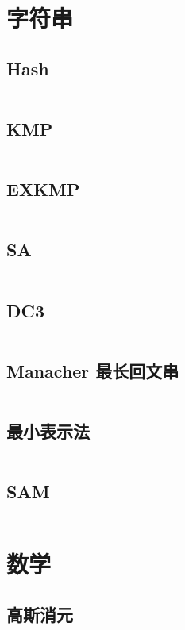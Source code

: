 \documentclass[titlepage,landscape,a4paper,10pt]{article}
\begin{document}
\begin{multicols}{2}
\begin{spacing}{0.8}
\section{字符串}

\subsection{Hash}
\inputminted{cpp}{Strings/BKDRHash.cpp}

\subsection{KMP}
\inputminted{cpp}{Strings/KMP.cpp}

\subsection{EXKMP}
\inputminted{cpp}{Strings/EXKMP.cpp}

\subsection{SA}
\inputminted{cpp}{Strings/SA.cpp}

\subsection{DC3}
\inputminted{cpp}{Strings/DC3.cpp}

\subsection{Manacher 最长回文串}
\inputminted{cpp}{Strings/Manacher.cpp}

\subsection{最小表示法}
\inputminted{cpp}{Strings/最小表示法.cpp}

\subsection{SAM}
\inputminted{cpp}{Strings/SAM.cpp}

\section{数学}

\subsection{高斯消元}
\inputminted{cpp}{Math/高斯消元.cpp}


\end{spacing}
\end{multicols}
\end{document}

